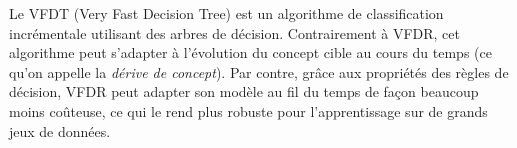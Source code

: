         Le VFDT (Very Fast Decision Tree) est un algorithme de classification incrémentale utilisant des arbres de décision. Contrairement à VFDR, cet algorithme peut s’adapter à l’évolution du concept cible au cours du temps (ce qu'on appelle la \emph{dérive de concept}). Par contre, grâce aux propriétés des règles de décision, VFDR peut adapter son modèle au fil du temps de façon beaucoup moins coûteuse, ce qui le rend plus robuste pour l'apprentissage sur de grands jeux de données.